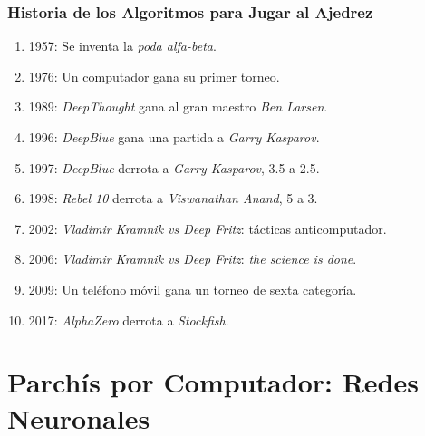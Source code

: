\documentclass[a4paper,t,xcolor=pst,dvips,colortheme]{beamer}
\begin{document}
\begin{frame}[c]
    \frametitle{Historia de los Algoritmos para Jugar al Ajedrez}
    \begin{enumerate}[<+->]
        \item 1957: Se inventa la \emph{poda alfa-beta}.
        \item 1976: Un computador gana su primer torneo.
        \item 1989: \emph{DeepThought} gana al gran maestro \emph{Ben Larsen}.
        \item 1996: \emph{DeepBlue} gana una partida a \emph{Garry Kasparov}.
        \item 1997: \emph{DeepBlue} derrota a \emph{Garry Kasparov}, 3.5 a 2.5.
        \item 1998: \emph{Rebel 10} derrota a \emph{Viswanathan Anand}, 5 a 3.
        \item 2002: \emph{Vladimir Kramnik vs Deep Fritz}: tácticas anticomputador.
        \item 2006: \emph{Vladimir Kramnik vs Deep Fritz}: \emph{the science is done}.
        \item 2009: Un teléfono móvil gana un torneo de sexta categoría.
        \item 2017: \emph{AlphaZero} derrota a \emph{Stockfish}.
    \end{enumerate}
\end{frame}

\section{Parchís por Computador: Redes Neuronales}


\end{document}
